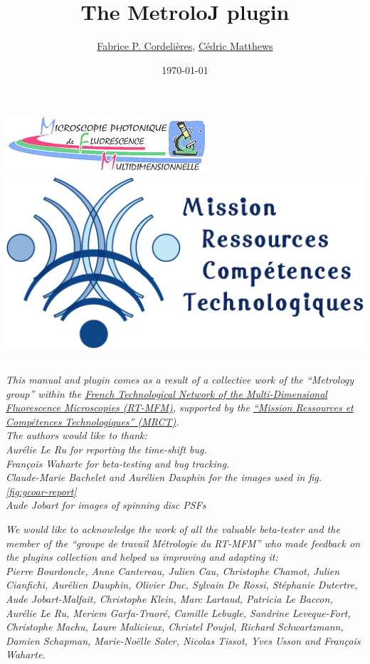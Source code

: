 \documentclass[a4paper, 11pt]{report}%
\title{
\textbf{The MetroloJ plugin}}
\author{\href{mailto:fabrice.cordelieres@gmail.com}{Fabrice P. Cordelières}, \href{mailto:cedric.matthews@ibdml.univ-mrs.fr }{Cédric Matthews}
\date{\today}        %
}
\begin{document}
\begin{table}[!t]
	\begin {center}
			\includegraphics[width=0.35\linewidth]{img/logo_RT-MFM}  \hfill \includegraphics[width=0.25\linewidth]{img/logo_mrct}
	\end {center}
\end{table}

\maketitle

\newpage

\tableofcontents

\newpage

\begin{flushright}
\section*{}
\textit{This manual and plugin comes as a result of a collective work of the ``Metrology group'' within the \href{http://rtmfm.ibl.fr/}{French Technological Network of the Multi-Dimensional Fluorescence Microscopies (RT-MFM)}, supported by the \href{http://www.mrct.cnrs.fr/}{``Mission Ressources et Compétences Technologiques'' (MRCT)}.\\
\vspace{0.5cm}
The authors would like to thank:\\
Aurélie Le Ru for reporting the time-shift bug.\\
Fran\c cois Waharte for beta-testing and bug tracking.\\
Claude-Marie Bachelet and Aurélien Dauphin for the images used in fig. \ref{fig:gcoar-report}\\
Aude Jobart for images of spinning disc PSFs\\
\vspace{0.5cm}
}

\textit{We would like to acknowledge the work of all the valuable beta-tester and the member of the ``groupe de travail Métrologie du RT-MFM'' who made feedback on the plugins collection and helped us improving and adapting it:\\
Pierre Bourdoncle, Anne Cantereau, Julien Cau, Christophe Chamot, Julien Cianfichi, 
Aurélien Dauphin, Olivier Duc, Sylvain De Rossi, Stéphanie Dutertre, Aude Jobart-Malfait, Christophe Klein, Marc Lartaud, Patricia Le Baccon, Aurélie Le Ru, Meriem Garfa-Traoré, Camille Lebugle, Sandrine Leveque-Fort, Christophe Machu, Laure Malicieux, Christel Poujol, Richard Schwartzmann, Damien Schapman, Marie-Noëlle Soler, Nicolas Tissot, Yves Usson and Fran\c cois Waharte.
}
\end{flushright}
\newpage
\end{document}

